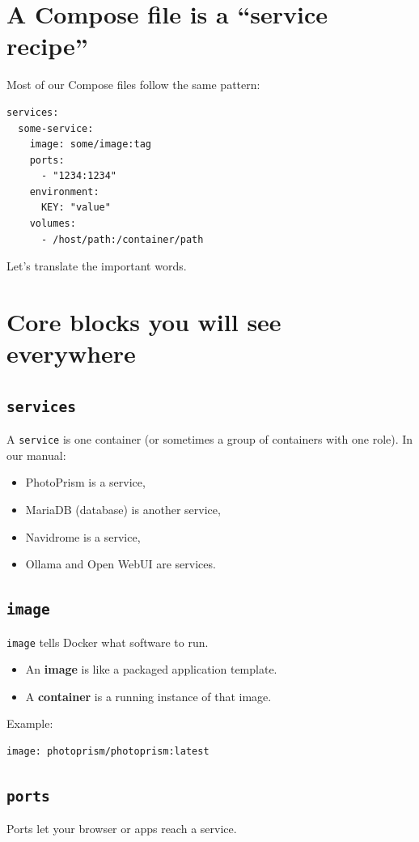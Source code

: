 \section{A Compose file is a ``service recipe''}
Most of our Compose files follow the same pattern:

\begin{lstlisting}
services:
  some-service:
    image: some/image:tag
    ports:
      - "1234:1234"
    environment:
      KEY: "value"
    volumes:
      - /host/path:/container/path
\end{lstlisting}

Let's translate the important words.

\section{Core blocks you will see everywhere}
\subsection{\texttt{services}}
A \texttt{service} is one container (or sometimes a group of containers with one role).
In our manual:
\begin{itemize}[leftmargin=*]
  \item PhotoPrism is a service,
  \item MariaDB (database) is another service,
  \item Navidrome is a service,
  \item Ollama and Open WebUI are services.
\end{itemize}

\subsection{\texttt{image}}
\texttt{image} tells Docker what software to run.
\begin{itemize}[leftmargin=*]
  \item An \textbf{image} is like a packaged application template.
  \item A \textbf{container} is a running instance of that image.
\end{itemize}

Example:
\begin{lstlisting}
image: photoprism/photoprism:latest
\end{lstlisting}

\subsection{\texttt{ports}}
Ports let your browser or apps reach a service.

